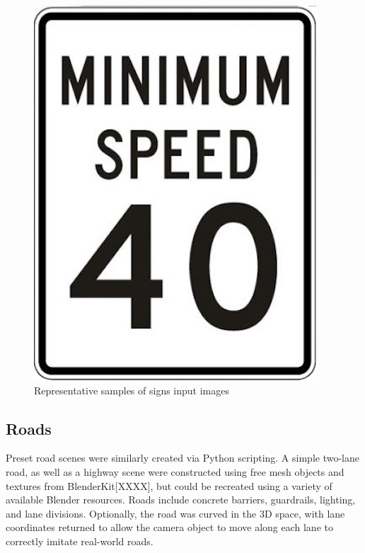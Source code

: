 \documentclass[journal]{IEEEtran}
\begin{document}
\begin{figure}[ht]
\begin{minipage}{0.1\textwidth}
    \end{minipage}\hfill
    \begin{minipage}{0.1\textwidth}
        \centering
        \includegraphics[width=\linewidth]{images/Minimum Speed 40.png}

    \end{minipage}
    \caption{Representative samples of signs input images}
    \label{fig:row_of_images}
\end{figure}

\subsection{Roads}
Preset road scenes were similarly created via Python scripting. A simple two-lane road, as well as a highway scene were constructed using free mesh objects and textures from BlenderKit[XXXX], but could be recreated using a variety of available Blender resources. Roads include concrete barriers, guardrails, lighting, and lane divisions. Optionally, the road was curved in the 3D space, with lane coordinates returned to allow the camera object to move along each lane to correctly imitate real-world roads. 
\end{document}
